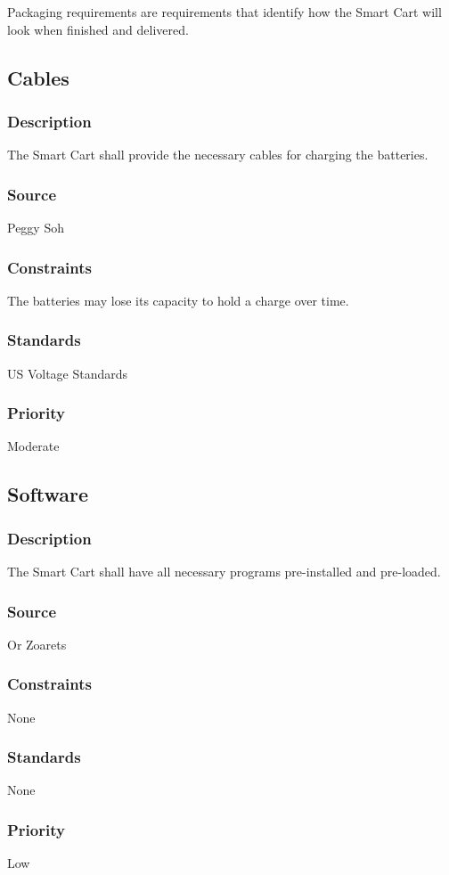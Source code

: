 Packaging requirements are requirements that identify how the Smart Cart will look when finished and delivered.

\subsection{Cables}
\subsubsection{Description}
The Smart Cart shall provide the necessary cables for charging the batteries.
\subsubsection{Source}
Peggy Soh
\subsubsection{Constraints}
The batteries may lose its capacity to hold a charge over time. 
\subsubsection{Standards}
US Voltage Standards
\subsubsection{Priority}
Moderate


\subsection{Software}
\subsubsection{Description}
The Smart Cart shall have all necessary programs pre-installed and pre-loaded.
\subsubsection{Source}
Or Zoarets
\subsubsection{Constraints}
None
\subsubsection{Standards}
None
\subsubsection{Priority}
Low



